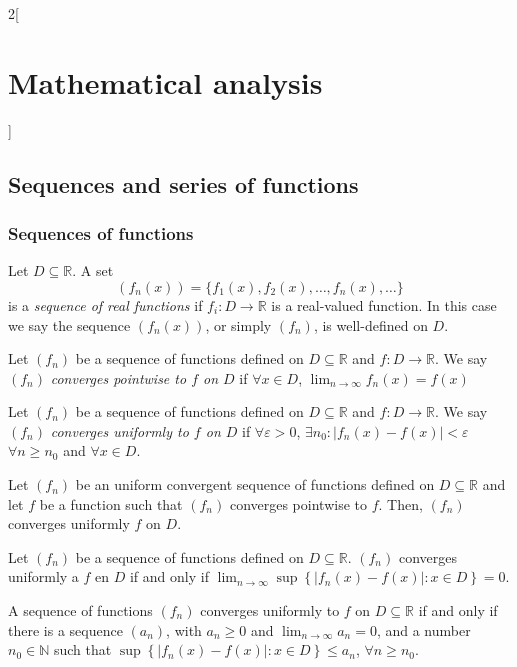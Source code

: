 \documentclass[class=article,crop=false]{standalone}
\begin{document}
\begin{multicols}{2}[\section{Mathematical analysis}]
\subsection{Sequences and series of functions}
\subsubsection*{Sequences of functions}
\begin{definition}
Let $D\subseteq\mathbb{R}$. A set $$(f_n(x))=\{f_1(x),f_2(x),\ldots,f_n(x),\ldots\}$$ is a \textit{sequence of real functions} if $f_i:D\rightarrow\mathbb{R}$ is a real-valued function. In this case we say the sequence $(f_n(x))$, or simply $(f_n)$, is well-defined on $D$.
\end{definition}
\begin{definition}
Let $(f_n)$ be a sequence of functions defined on $D\subseteq\mathbb{R}$ and $f:D\rightarrow\mathbb{R}$. We say $(f_n)$ \textit{converges pointwise to $f$ on $D$} if $\forall x\in D$, $\displaystyle\lim_{n\to\infty}f_n(x)=f(x)$
\end{definition}
\begin{definition}
Let $(f_n)$ be a sequence of functions defined on $D\subseteq\mathbb{R}$ and $f:D\rightarrow\mathbb{R}$. We say $(f_n)$ \textit{converges uniformly to $f$ on $D$} if $\forall\varepsilon>0$, $\exists n_0:|f_n(x)-f(x)|<\varepsilon$ $\forall n\geq n_0$ and $\forall x\in D$.
\end{definition}
\begin{lemma}
Let $(f_n)$ be an uniform convergent sequence of functions defined on $D\subseteq\mathbb{R}$ and let $f$ be a function such that $(f_n)$ converges pointwise to $f$. Then, $(f_n)$ converges uniformly $f$ on $D$.
\end{lemma}
\begin{lemma}
Let $(f_n)$ be a sequence of functions defined on $D\subseteq\mathbb{R}$. $(f_n)$ converges uniformly a $f$ en $D$ if and only if $\displaystyle \lim_{n\to\infty}\sup\left\{|f_n(x)-f(x)|:x\in D\right\}=0$.
\end{lemma}
\begin{corollary}
A sequence of functions $(f_n)$ converges uniformly to $f$ on $D\subseteq\mathbb{R}$ if and only if there is a sequence $(a_n)$, with $a_n\geq 0$ and $\displaystyle \lim_{n\to\infty} a_n=0$, and a number $\displaystyle n_0\in\mathbb{N}$ such that $\sup\left\{|f_n(x)-f(x)|: x\in D\right\}\leq a_n$, $\forall n\geq n_0$.
\end{corollary}
\begin{theorem}

\end{theorem}
\end{multicols}
\end{document}
